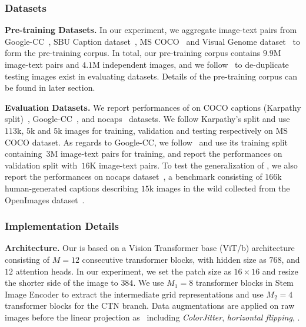 \subsubsection{Datasets}

\vspace{1mm}
\noindent \textbf{Pre-training Datasets.}
In our experiment, we aggregate image-text pairs from Google-CC~\citep{sharma2018conceptual}, SBU Caption dataset~\citep{ordonez2011im2text}, MS COCO~\citep{lin2014microsoft} and Visual Genome dataset~\citep{krishna2017visual} to form the pre-training corpus.  In total, our pre-training corpus contains $9.9$M image-text pairs and $4.1$M independent images, and we follow~\citep{lu202012} to de-duplicate testing images exist in evaluating datasets. Details of the pre-training corpus can be found in later section. 

\vspace{1mm}
\noindent \textbf{Evaluation Datasets.}
We report performances of \vitcap on {{COCO captions}} (Karpathy split)~\citep{lin2014microsoft}, {{Google-CC}}~\citep{sharma2018conceptual}, and {{nocaps}}~\citep{agrawal2019nocaps} datasets. We follow Karpathy’s split and use~$113$k, $5$k and $5$k images for training, validation and testing respectively on MS COCO dataset. As regards to Google-CC, we follow~\citep{sharma2018conceptual} and use its training split containing~$3$M image-text pairs for training, and report the performances on validation split with~$16$K image-text pairs. To test the generalization of \vitcap\!\!, we also report the performances on nocaps dataset~\citep{agrawal2019nocaps}, a benchmark consisting of $166$k human-generated captions describing $15$k images in the wild collected from the OpenImages dataset~\citep{shao2019objects365}. 



\subsubsection{Implementation Details}
\vspace{1mm}
\noindent \textbf{Architecture.}
Our \vitcap is based on a Vision Transformer base (ViT/b) architecture consisting of $M=12$ consecutive transformer blocks, with hidden size as $768$, and $12$ attention heads. In our experiment, we set the patch size as $16 \times 16$ and resize the shorter side of the image to $384$. We use $M_1=8$ transformer blocks in Stem Image Encoder to extract the intermediate grid representations and use $M_2=4$ transformer blocks for the CTN branch.
Data augmentations are applied on raw images before the linear projection as~\citep{dosovitskiy2020image} including \textit{ColorJitter}, \textit{horizontal flipping}, \etc.

